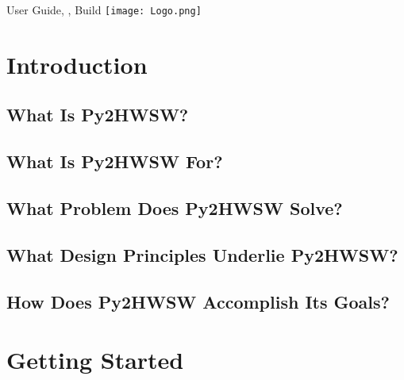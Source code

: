\documentclass{ug}
\date{\today}
\begin{document}
\maketitle
{}

\vspace*{\fill}
User Guide, , Build 
\hspace*{\fill} \texttt{[image: Logo.png]}

\cleardoublepage
{}
\setcounter{page}{1}

\cleardoublepage
\tableofcontents
\clearpage
\listoftables
\clearpage
\listoffigures
\cleardoublepage
{}
\setcounter{page}{1}

%
%
\section{Introduction}
\label{sec:intro}



\subsection{What Is Py2HWSW?}
\label{sec:whatispy2}


\subsection{What Is Py2HWSW For?}
\label{sec:purpose}


\subsection{What Problem Does Py2HWSW Solve?}
\label{sec:problem}


\subsection{What Design Principles Underlie Py2HWSW?}
\label{sec:principles}


\subsection{How Does Py2HWSW Accomplish Its Goals?}
\label{sec:how}


%
%
\ifdefined\SECTIONCLEARPAGE
\clearpage
\fi
\section{Getting Started}
\label{sec:gs}
\end{document}
